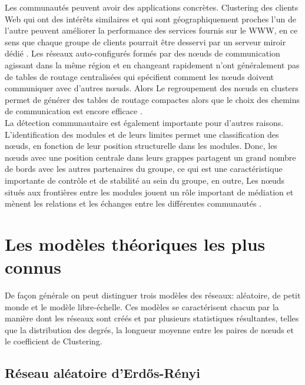 Les communautés peuvent avoir des applications concrètes. Clustering des clients Web qui ont des intérêts similaires et qui sont géographiquement proches l'un de l'autre peuvent améliorer la performance des services fournis sur le WWW, en ce sens que chaque groupe de clients pourrait être desservi par un serveur miroir dédié \cite{KriW2000}.
Les réseaux auto-configurés formés par des nœuds de communication agissant dans la même région et en changeant rapidement n'ont généralement pas de tables de routage centralisées qui spécifient comment les nœuds doivent communiquer avec d'autres nœuds.
Alors Le regroupement des nœuds en clusters permet de générer des tables de routage compactes alors que le choix des chemins de communication est encore efficace \cite{Steen2001}.\\
La détection communautaire est également importante pour d'autres raisons. L'identification des modules et de leurs limites permet une classification des nœuds, en fonction de leur position structurelle dans les modules. Donc, les nœuds avec une position centrale dans leurs grappes partagent un grand nombre de bords avec les autres partenaires du groupe, ce qui est une caractéristique importante de contrôle et de stabilité au sein du groupe, en outre, Les nœuds situés aux frontières entre les modules jouent un rôle important de médiation et mènent les relations et les échanges entre les différentes communautés \cite{Csermely2008}.

\section{Les modèles théoriques les plus connus} 

De façon générale on peut distinguer trois modèles des réseaux: aléatoire, de petit monde et le modèle libre-échelle. Ces modèles se caractérisent chacun par la manière dont les réseaux sont créés et par plusieurs statistiques résultantes, telles que la distribution des degrés, la longueur moyenne entre les paires de nœuds et le coefficient de Clustering.

   \subsection{Réseau aléatoire d'Erd\H{o}s-Rényi}
   
